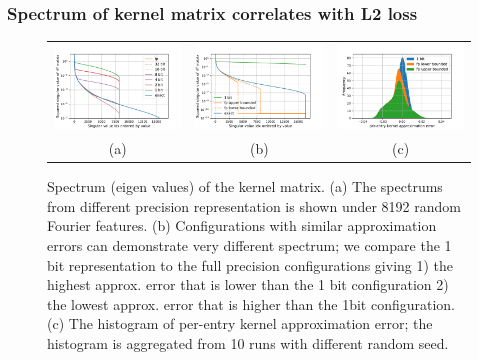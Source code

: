 \subsubsection{Spectrum of kernel matrix correlates with L2 loss}
\label{subsubsec:bump_spectrum}
\begin{figure}
	\centering
	\begin{tabular}{c c c}
		\includegraphics[width=.33\linewidth]{figures/spectrum_n_rff_8192.pdf} &
		\includegraphics[width=.33\linewidth]{figures/different_spectrum_with_same_kernel_approx_error_log.pdf} &
		\includegraphics[width=.33\linewidth]{figures/error_histogram.pdf} \\
		(a) & (b) & (c)
	\end{tabular}
	\caption{Spectrum (eigen values) of the kernel matrix. (a) The spectrums from different precision representation is shown under 8192 random Fourier features. (b) Configurations with similar approximation errors can demonstrate very different spectrum; we compare the 1 bit representation to the full precision configurations giving 1) the highest approx. error that is lower than the 1 bit configuration 2) the lowest approx. error that is higher than the 1bit configuration. (c) The histogram of per-entry kernel approximation error; the histogram is aggregated from 10 runs with different random seed.}
	\label{fig:spectrums}
\end{figure}

